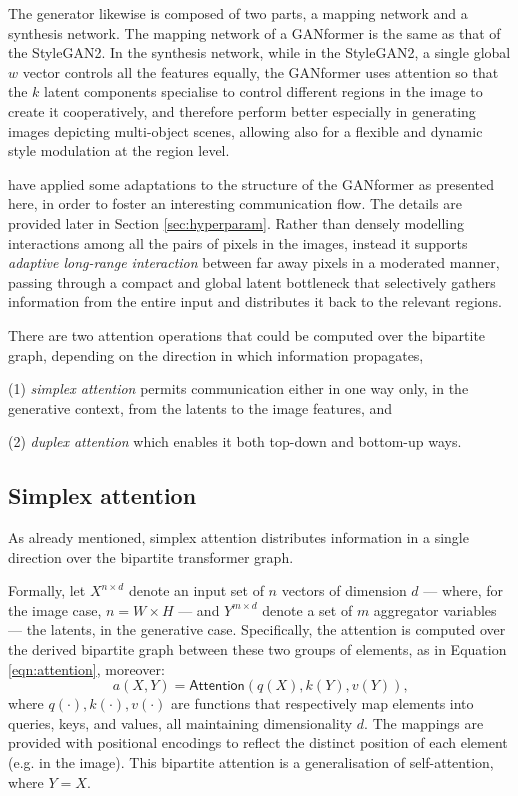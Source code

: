 \documentclass{article}
\begin{document}
	The generator likewise is composed of two parts, a mapping network and a synthesis 
	network. 
	The mapping network of a GANformer is the same as that of the StyleGAN2.
	In the synthesis network, while in the StyleGAN2, a single global $w$ vector controls all the 
	features equally, the GANformer uses attention so that the $k$ latent components specialise to 
	control different regions in the image to create it cooperatively, and therefore perform better 
	especially in generating images depicting multi-object scenes, allowing also for a flexible and 
	dynamic style modulation at the region level.
	
	\citet{hudson2021generative} have applied some adaptations to the structure of the GANformer as 
	presented here, in order to foster an interesting communication flow. The details are provided later 
	in Section \ref{sec:hyperparam}.
	Rather than densely modelling interactions among all the pairs of pixels in the images, instead it 
	supports \textit{adaptive long-range interaction} between far away pixels in a moderated manner, 
	passing through a compact and global latent bottleneck that selectively gathers information from 
	the entire input and distributes it back to the relevant regions. 
		
	There are two attention operations that could be computed over the bipartite graph, depending 
	on the direction in which information propagates, 
	\begin{enumerate*}
		\item [(1)] \textit{simplex attention} permits communication either in one way only, in the 
		generative context, from the latents to the image features, and
		\item [(2)] \textit{duplex attention} which enables it both top-down and bottom-up ways.
	\end{enumerate*}
	
	\subsection{Simplex attention}
	As already mentioned, simplex attention distributes information in a single direction over the 
	bipartite transformer graph. 
	
	Formally, let $X^{n\times d}$ denote an input set of $n$ vectors of dimension $d$ — where, for the 
	image case, $n = W\times H$ — and $Y^{m\times d}$ denote a set of $m$ aggregator variables — 
	the latents, in the generative case. Specifically, the attention is computed over the derived bipartite 
	graph between these two groups of elements, as in Equation \eqref{eqn:attention}, moreover:
	\begin{equation}
		\label{eqn:attention2}
		a(X,Y)=\mathsf{Attention}(q(X), k(Y), v(Y)) \mbox{,}
	\end{equation}
	where $q(\cdot), k(\cdot), v(\cdot)$ are functions that respectively map elements into queries, 
	keys, and values, all maintaining dimensionality $d$. 
	The mappings are provided with positional encodings to reflect the distinct position of each element 
	(e.g. in the image). This bipartite attention is a generalisation of self-attention, where $Y = X$.
	
\end{document}
